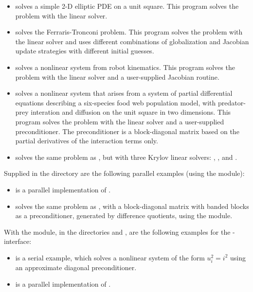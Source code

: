 \begin{itemize}
\item {}
  solves a simple 2-D elliptic PDE on a unit square.
 \newline
  This program solves the problem with the {\kinband} linear solver.
\item {}
  solves the Ferraris-Tronconi problem.
  \newline
  This program solves the problem with the {\kindense} linear solver
  and uses different combinations of globalization and Jacobian
  update strategies with different initial guesses.
\item {}
  solves a nonlinear system from robot kinematics.
  \newline
  This program solves the problem with the {\kindense} linear solver
  and a user-supplied Jacobian routine.
\item {}
  solves a nonlinear system that arises from a system of partial
  differential equations describing a six-species food web population
  model, with predator-prey interation and diffusion on the unit
  square in two dimensions.
  \newline
  This program solves the problem with the {\kinspgmr} linear solver
  and a user-supplied preconditioner. The preconditioner is a
  block-diagonal matrix based on the partial derivatives of the
  interaction terms only.
\item {}
  solves the same problem as , but with three Krylov
  linear solvers: , , and .
\end{itemize}
Supplied in the  directory are
the following parallel examples (using the {\nvecp} module):
\begin{itemize}
\item {}
  is a parallel implementation of .
\item {}
  solves the same problem as , with a block-diagonal matrix
  with banded blocks as a preconditioner, generated by difference quotients,
  using the {\kinbbdpre} module.
\end{itemize}
With the {\fkinsol} module, in the directories 
 and
, are the following examples for
the {\F}-{\C} interface:
\begin{itemize}
\item {}
  is a serial example, which solves a nonlinear system of the form
  $u_i^2 = i^2$ using an approximate diagonal preconditioner.
\item {}
  is a parallel implementation of .
\end{itemize}


